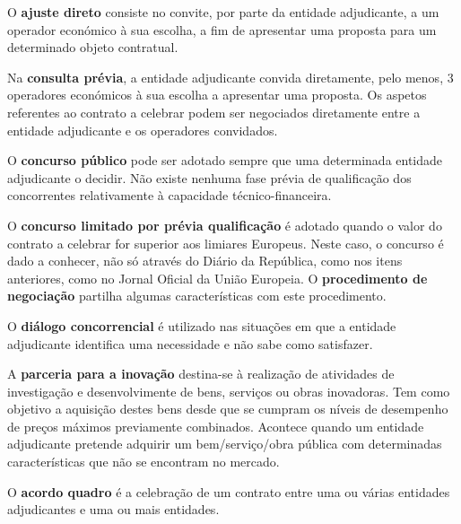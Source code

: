 \begin{my_enumerate}
	
	\item O \textbf{ajuste direto} consiste no convite, por parte da entidade adjudicante, a um operador económico à sua escolha, a fim de apresentar uma proposta para um determinado objeto contratual.
	
	\item Na \textbf{consulta prévia}, a entidade adjudicante convida diretamente, pelo menos, 3 operadores económicos à sua escolha a apresentar uma proposta. Os aspetos referentes ao contrato a celebrar podem ser negociados diretamente entre a entidade adjudicante e os operadores convidados. 
	
	\item O \textbf{concurso público} pode ser adotado sempre que uma determinada entidade adjudicante o decidir. Não existe nenhuma fase prévia de qualificação dos concorrentes relativamente à capacidade técnico-financeira. 
	
	\item O \textbf{concurso limitado por prévia qualificação} é adotado quando o valor do contrato a celebrar for superior aos limiares Europeus. Neste caso, o concurso é dado a conhecer, não só através do Diário da República, como nos itens anteriores, como no Jornal Oficial da União Europeia. O \textbf{procedimento de negociação} partilha algumas características com este procedimento. 
	
	\item O \textbf{diálogo concorrencial} é utilizado nas situações em que a entidade adjudicante identifica uma necessidade e não sabe como satisfazer. 
	
	\item A \textbf{parceria para a inovação} destina-se à realização de atividades de investigação e desenvolvimente de bens, serviços ou obras inovadoras. Tem como objetivo a aquisição destes bens desde que se cumpram os níveis de desempenho de preços máximos
	previamente combinados. Acontece quando um entidade adjudicante pretende adquirir um bem/serviço/obra
	pública com determinadas características que não se encontram no mercado. 
	
	\item O \textbf{acordo quadro} é a celebração de um contrato entre uma ou várias entidades adjudicantes e uma ou mais entidades. 
	
	
	
\end{my_enumerate}

